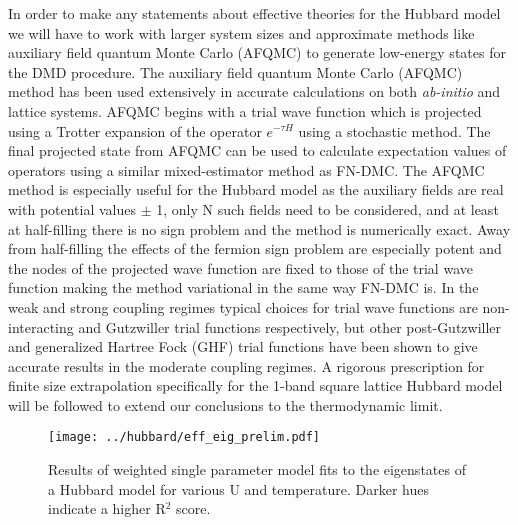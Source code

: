 \documentclass[12pt]{article}
\begin{document}
In order to make any statements about effective theories for the Hubbard model we will have to work with larger system sizes and approximate methods like auxiliary field quantum Monte Carlo (AFQMC) to generate low-energy states for the DMD procedure.
The auxiliary field quantum Monte Carlo (AFQMC) method has been used extensively in accurate calculations on both \textit{ab-initio} and lattice systems.
AFQMC begins with a trial wave function which is projected using a Trotter expansion of the operator $e^{-\tau H}$ using a stochastic method.
The final projected state from AFQMC can be used to calculate expectation values of operators using a similar mixed-estimator method as FN-DMC.
The AFQMC method is especially useful for the Hubbard model as the auxiliary fields are real with potential values $\pm$ 1, only N such fields need to be considered, and at least at half-filling there is no sign problem and the method is numerically exact. 
Away from half-filling the effects of the fermion sign problem are especially potent and the nodes of the projected wave function are fixed to those of the trial wave function making the method variational in the same way FN-DMC is.
In the weak and strong coupling regimes typical choices for trial wave functions are non-interacting and Gutzwiller trial functions respectively, but other post-Gutzwiller and generalized Hartree Fock (GHF) trial functions have been shown to give accurate results in the moderate coupling regimes.
A rigorous prescription for finite size extrapolation specifically for the 1-band square lattice Hubbard model will be followed to extend our conclusions to the thermodynamic limit.

\begin{figure}[H]
\centering
\texttt{[image: ../hubbard/eff\_eig\_prelim.pdf]}
\caption{Results of weighted single parameter model fits to the eigenstates of a Hubbard model for various U and temperature. Darker hues indicate a higher R$^2$ score.}
\label{fig:Hubbard}
\end{figure}	
\end{document}
